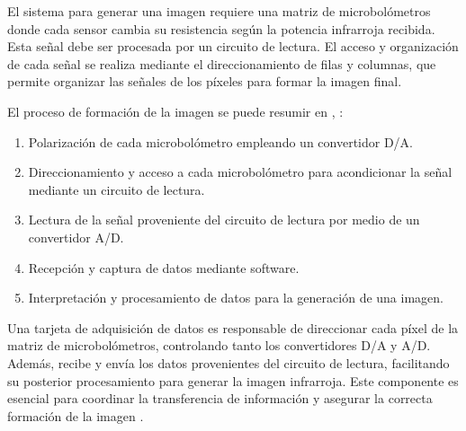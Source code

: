 El sistema para generar una imagen requiere una matriz de microbolómetros donde cada sensor cambia su resistencia según la potencia infrarroja recibida. Esta señal debe ser procesada por un circuito de lectura. El acceso y organización de cada señal se realiza mediante el direccionamiento de filas y columnas, que permite organizar las señales de los píxeles para formar la imagen final.


El proceso de formación de la imagen se puede resumir en \cite{BlancoMDA}, \cite{Hernandez2021}:
\begin{enumerate}
 \item Polarización de cada microbolómetro empleando un convertidor D/A.
 \item Direccionamiento y acceso a cada microbolómetro para acondicionar la señal mediante un circuito de lectura.
 \item Lectura de la señal proveniente del circuito de lectura por medio de un convertidor A/D.
 \item Recepción y captura de datos mediante software.
 \item Interpretación y procesamiento de datos para la generación de una imagen.
\end{enumerate}

Una tarjeta de adquisición de datos es responsable de direccionar cada píxel de la matriz de microbolómetros, controlando tanto los convertidores D/A y A/D. Además, recibe y envía los datos provenientes del circuito de lectura, facilitando su posterior procesamiento para generar la imagen infrarroja. Este componente es esencial para coordinar la transferencia de información y asegurar la correcta formación de la imagen \cite{Hernandez2021}.